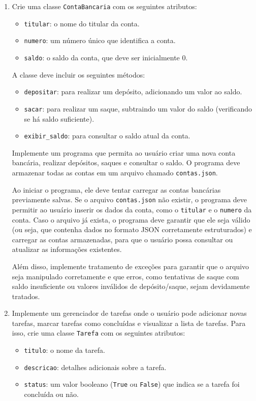 \documentclass[12pt]{article}
\begin{document}
\begin{enumerate}
  \item Crie uma classe \texttt{ContaBancaria} com os seguintes atributos:
    \begin{itemize}
      \item \texttt{titular}: o nome do titular da conta.
      \item \texttt{numero}: um número único que identifica a conta.
      \item \texttt{saldo}: o saldo da conta, que deve ser inicialmente 0.
    \end{itemize}
    A classe deve incluir os seguintes métodos:
    \begin{itemize}
      \item \texttt{depositar}: para realizar um depósito, adicionando um valor ao saldo.
      \item \texttt{sacar}: para realizar um saque, subtraindo um valor do saldo (verificando se há saldo suficiente).
      \item \texttt{exibir\_saldo}: para consultar o saldo atual da conta.
    \end{itemize}

    Implemente um programa que permita ao usuário criar uma nova conta bancária, realizar depósitos, saques e consultar o saldo. O programa deve armazenar todas as contas em um arquivo chamado \texttt{contas.json}.

    Ao iniciar o programa, ele deve tentar carregar as contas bancárias previamente salvas. Se o arquivo \texttt{contas.json} não existir, o programa deve permitir ao usuário inserir os dados da conta, como o \texttt{titular} e o \texttt{numero} da conta. Caso o arquivo já exista, o programa deve garantir que ele seja válido (ou seja, que contenha dados no formato JSON corretamente estruturados) e carregar as contas armazenadas, para que o usuário possa consultar ou atualizar as informações existentes.

    Além disso, implemente tratamento de exceções para garantir que o arquivo seja manipulado corretamente e que erros, como tentativas de saque com saldo insuficiente ou valores inválidos de depósito/saque, sejam devidamente tratados.

  \item Implemente um gerenciador de tarefas onde o usuário pode adicionar novas tarefas, marcar tarefas como concluídas e visualizar a lista de tarefas. Para isso, crie uma classe \texttt{Tarefa} com os seguintes atributos:
    \begin{itemize}
      \item \texttt{titulo}: o nome da tarefa.
      \item \texttt{descricao}: detalhes adicionais sobre a tarefa.
      \item \texttt{status}: um valor booleano (\texttt{True} ou \texttt{False}) que indica se a tarefa foi concluída ou não.
    \end{itemize}


\end{enumerate}
\end{document}
